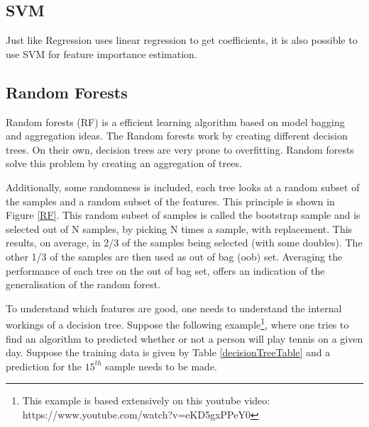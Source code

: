 \subsection{SVM}
Just like Regression uses linear regression to get coefficients, it is also possible to use SVM for feature importance estimation.

\subsection{Random Forests}
Random forests (RF)  is a efficient learning algorithm based on model bagging and aggregation ideas\citep{rfPaper}. The Random forests work by creating different decision trees. On their own, decision trees are very prone to overfitting. Random forests solve this problem by creating an aggregation of trees. 

\npar

Additionally, some randomness is included, each tree looks at a random subset of the samples and a random subset of the features. This principle is shown in Figure \ref{RF}. This random subset of samples is called the bootstrap sample and is selected out of N samples, by picking N times a sample, with replacement. This results, on average, in 2/3 of the samples being selected (with some doubles). The other 1/3 of the samples are then used as out of bag (oob)  set. Averaging the performance of each tree on the out of bag set, offers an indication of the generalisation of the random forest.


\npar

To understand which features are good, one needs to understand the internal workings of a decision tree. Suppose the following example\footnote{This example is based extensively on this youtube video: https://www.youtube.com/watch?v=eKD5gxPPeY0}, where one tries to find an algorithm to predicted whether or not a person will play tennis on a given day. Suppose the training data is given by Table \ref{decisionTreeTable} and a prediction for the $15^{th}$ sample needs to be made.

